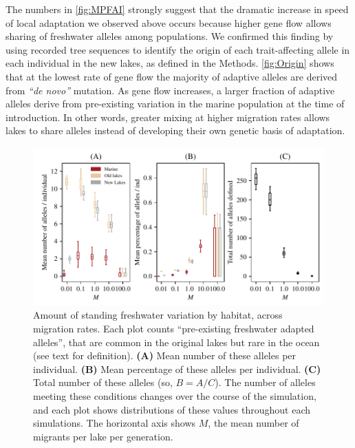 \documentclass{article}
\begin{document}
The numbers in \autoref{fig:MPFAI} strongly suggest that the dramatic increase in speed of local adaptation we observed above occurs because higher gene flow allows sharing of freshwater alleles among populations.
We confirmed this finding by using recorded tree sequences to identify the origin of each trait-affecting allele in each individual in the new lakes, as defined in the Methods. 
\autoref{fig:Origin} shows that at the lowest rate of gene flow the majority of adaptive alleles are derived from \emph{``de novo''} mutation. 
As gene flow increases, a larger fraction of adaptive alleles derive from pre-existing variation in the marine population at the time of introduction. 
In other words, greater mixing at higher migration rates allows lakes to share alleles instead of developing their own genetic basis of adaptation.

\begin{figure}
    \begin{center}
          \includegraphics{Final_Plots/Freshwater_Alleles.pdf}
          \caption{
            Amount of standing freshwater variation by habitat, across migration rates.
            Each plot counts ``pre-existing freshwater adapted alleles'',
            that are common in the original lakes but rare in the ocean
            (see text for definition).
            \textbf{(A)} Mean number of these alleles per individual.
            \textbf{(B)} Mean percentage of these alleles per individual.
            \textbf{(C)} Total number of these alleles (so, $B = A/C$).
            The number of alleles meeting these conditions changes over the course of the simulation,
            and each plot shows distributions of these values throughout each simulations.
            The horizontal axis shows $M$, the mean number of migrants per lake per generation.}
        \label{fig:MPFAI}
    \end{center}
\end{figure}
\end{document}
